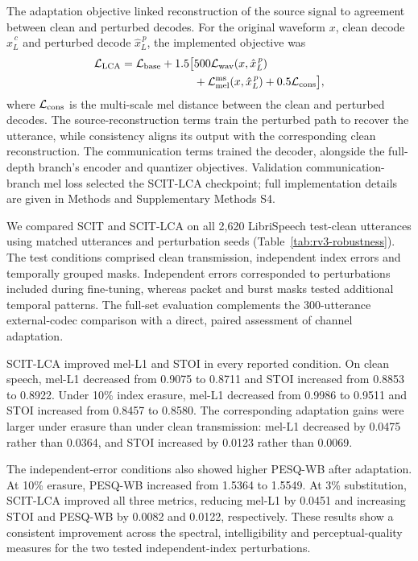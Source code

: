 The adaptation objective linked reconstruction of the source signal to agreement between clean and perturbed decodes. For the original waveform $x$, clean decode $\hat{x}_{L}^{\,c}$ and perturbed decode $\hat{x}_{L}^{\,p}$, the implemented objective was
\begin{equation}
\begin{split}
\mathcal L_{\rm LCA}
=\mathcal L_{\rm base}
+1.5\bigl[&
500\mathcal L_{\rm wav}(x,\hat{x}_{L}^{\,p})\\
&+\mathcal L_{\rm mel}^{\rm ms}(x,\hat{x}_{L}^{\,p})
+0.5\mathcal L_{\rm cons}\bigr],
\end{split}
\label{eq:rv3-lca}
\end{equation}
where $\mathcal L_{\rm cons}$ is the multi-scale mel distance between the clean and perturbed decodes. The source-reconstruction terms train the perturbed path to recover the utterance, while consistency aligns its output with the corresponding clean reconstruction. The communication terms trained the decoder, alongside the full-depth branch's encoder and quantizer objectives. Validation communication-branch mel loss selected the SCIT-LCA checkpoint; full implementation details are given in Methods and Supplementary Methods S4.

We compared SCIT and SCIT-LCA on all 2,620 LibriSpeech test-clean utterances using matched utterances and perturbation seeds (Table~\ref{tab:rv3-robustness}). The test conditions comprised clean transmission, independent index errors and temporally grouped masks. Independent errors corresponded to perturbations included during fine-tuning, whereas packet and burst masks tested additional temporal patterns. The full-set evaluation complements the 300-utterance external-codec comparison with a direct, paired assessment of channel adaptation.

SCIT-LCA improved mel-L1 and STOI in every reported condition. On clean speech, mel-L1 decreased from 0.9075 to 0.8711 and STOI increased from 0.8853 to 0.8922. Under 10\% index erasure, mel-L1 decreased from 0.9986 to 0.9511 and STOI increased from 0.8457 to 0.8580. The corresponding adaptation gains were larger under erasure than under clean transmission: mel-L1 decreased by 0.0475 rather than 0.0364, and STOI increased by 0.0123 rather than 0.0069.

The independent-error conditions also showed higher PESQ-WB after adaptation. At 10\% erasure, PESQ-WB increased from 1.5364 to 1.5549. At 3\% substitution, SCIT-LCA improved all three metrics, reducing mel-L1 by 0.0451 and increasing STOI and PESQ-WB by 0.0082 and 0.0122, respectively. These results show a consistent improvement across the spectral, intelligibility and perceptual-quality measures for the two tested independent-index perturbations.

